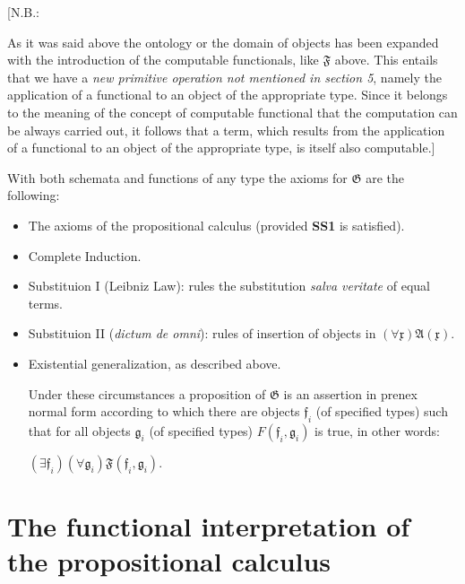 \documentclass[12pt]{article}
\begin{document}
[N.B.:

As it was said above the ontology or the domain of objects has been expanded with the introduction of the computable functionals, like $\mathfrak{F}$ above. This entails that we have a \emph{new primitive operation not mentioned in section 5}, namely the application of a functional to an object of the appropriate type. Since it belongs to the meaning of the concept of computable functional that the computation can be always carried out, it follows that a term, which results from the application of a functional to an object of the appropriate type, is itself also computable.]

With both schemata and functions of any type the axioms for $\mathfrak{G}$ are the following:

\begin{itemize}
\item The axioms of the propositional calculus (provided \textbf{SS1} is satisfied).

\item Complete Induction.

\item Substituion I (Leibniz Law): rules the substitution \emph{salva veritate} of equal terms.

\item Substituion II (\emph{dictum de omni}): rules of insertion of objects in $(\forall \mathfrak{x}) \mathfrak{A} (\mathfrak{x}).$

\item Existential generalization, as described above.

Under these circumstances a proposition of $\mathfrak{G}$ is an assertion in prenex normal form according to which there are objects $\mathfrak{f}_i$ (of specified types) such that for all objects $\mathfrak{g}_i$ (of specified types) $F (\mathfrak{f}_i, \mathfrak{g}_i)$ is true, in other words:

\begin{center}
$(\exists \mathfrak{f}_i) (\forall \mathfrak{g}_i) \mathfrak{F} (\mathfrak{f}_i, \mathfrak{g}_i).$ 
\end{center}

\end{itemize}

\section{The functional interpretation of the propositional calculus}\normalsize
\end{document}
